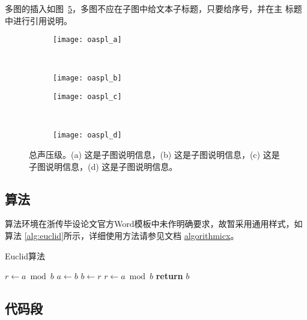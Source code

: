 多图的插入如图~\ref{fig:oaspl}，多图不应在子图中给文本子标题，只要给序号，并在主
标题中进行引用说明。
\begin{figure}[!htbp]
    \centering
    \begin{subfigure}[b]{0.35\textwidth}
      \texttt{[image: oaspl\_a]}
      \caption{}
      \label{fig:oaspl_a}
    \end{subfigure}%
    ~%
    \begin{subfigure}[b]{0.35\textwidth}
      \texttt{[image: oaspl\_b]}
      \caption{}
      \label{fig:oaspl_b}
    \end{subfigure}
    \begin{subfigure}[b]{0.35\textwidth}
      \texttt{[image: oaspl\_c]}
      \caption{}
      \label{fig:oaspl_c}
    \end{subfigure}%
    ~%
    \begin{subfigure}[b]{0.35\textwidth}
      \texttt{[image: oaspl\_d]}
      \caption{}
      \label{fig:oaspl_d}
    \end{subfigure}
    \caption[总声压级]{总声压级。(a) 这是子图说明信息，(b) 这是子图说明信息，(c) 这是子图说明信息，(d) 这是子图说明信息。}
    \label{fig:oaspl}
\end{figure}

\subsection{算法}

算法环境在浙传毕设论文官方Word模板中未作明确要求，故暂采用通用样式，如算法
\ref{alg:euclid}所示，详细使用方法请参见文档
\href{https://ctan.org/pkg/algorithmicx?lang=en}{algorithmicx}。

\begin{algorithm}[!htbp]
    \small
    \caption{Euclid算法}\label{alg:euclid}
    \begin{algorithmic}[1]
        \State $r\gets a\bmod b$
        \State $a\gets b$
        \State $b\gets r$
        \State $r\gets a\bmod b$
        \EndWhile\label{euclidendwhile}
        \State \textbf{return} $b$
        \EndProcedure
    \end{algorithmic}
\end{algorithm}

\subsection{代码段}

